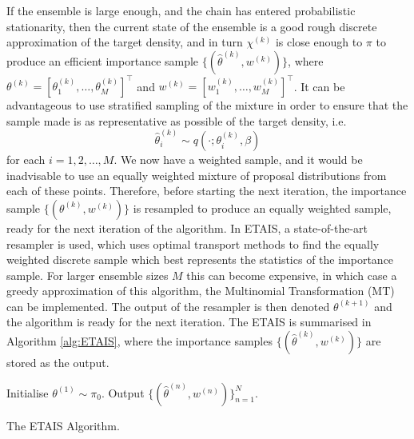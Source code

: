 \documentclass[final]{siamltex}
\begin{document}
If the ensemble is large enough, and the chain has entered
probabilistic stationarity, then the current state of the ensemble is
a good rough discrete approximation of the target density, and in turn
$\chi^{(k)}$ is close enough to $\pi$ to produce an efficient importance
sample $\{(\hat{\theta}^{(k)},w^{(k)})\}$,  where $\theta^{(k)} =
[\theta_1^{(k)}, \ldots, \theta_M^{(k)}]^\top$ and $w^{(k)} =
[w_1^{(k)}, \ldots, w_M^{(k)}]^\top$. It can be advantageous to use stratified sampling of the
mixture in order to
ensure that the sample made is as representative as possible of the
target density, i.e.
\begin{equation} \hat{\theta}_i^{(k)} \sim q(\cdot ; \theta_i^{(k)},\beta)\end{equation}
for each $i = 1,2,\ldots,M$.  We now have a weighted sample, and it
would be inadvisable to use an equally weighted mixture of proposal
distributions from each of these points. Therefore, before starting
the next iteration, the importance sample
$\{(\theta^{(k)},w^{(k)})\}$ is resampled to produce an equally
weighted sample, ready for the next iteration of the algorithm. In
ETAIS, a state-of-the-art resampler is used, which uses optimal
transport methods to find the equally weighted discrete sample which
best represents the statistics of the importance
sample\cite{reich2013nonparametric}. For larger ensemble sizes $M$ this can become
expensive, in which case a greedy approximation of this algorithm, the
Multinomial Transformation (MT) can be
implemented\cite{cotter2015parallel}. The output of the resampler is then denoted
$\theta^{(k+1)}$ and the algorithm is ready for the next
iteration. The ETAIS is summarised in Algorithm \ref{alg:ETAIS}, where
the importance samples $\{(\hat{\theta}^{(k)},w^{(k)})\}$ are stored as
the output.

\begin{table}[!h]
\centering
\begin{algorithm}[H]
\DontPrintSemicolon
\BlankLine
	Initialise $\theta^{(1)} \sim \pi_0$.\;
	Output $\{(\hat{\theta}^{(n)},w^{(n)})\}_{n=1}^N$.
\caption{The ETAIS Algorithm.\label{alg:ETAIS}}
\end{algorithm}
\end{table}
\end{document}
